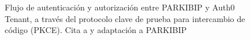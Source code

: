 \begin{figure}[!h]
\caption{Flujo de autenticación y autorización entre PARKIBIP y Auth0 Tenant, a través del protocolo clave de prueba para intercambio de código (PKCE). Cita a \cite{Auth0:PKCE} y adaptación a PARKIBIP}
\label{FIG:flow-PKCE}
\end{figure}

